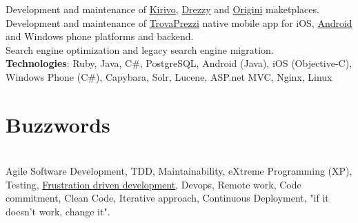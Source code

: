 \documentclass[letterpaper]{twentysecondcv} %
\begin{document}
\begin{twenty}
{	Development and maintenance  of \href{http://www.kirivo.it}{Kirivo}, \href{http://www.drezzy.it}{Drezzy} and \href{http://www.origini.it}{Origini} maketplaces.\\	
	Development and maintenance  of \href{http://www.trovaprezzi.it}{TrovaPrezzi} native mobile app for iOS, \href{https://play.google.com/store/apps/details?id=it.trovaprezzi.android}{Android}
	and Windows phone platforms and backend.\\
	Search engine optimization and legacy search engine migration.\\
\textbf{Technologies}: Ruby, Java, C\#, PostgreSQL, Android (Java), iOS (Objective-C), Windows Phone (C\#), Capybara, Solr, Lucene, ASP.net MVC, Nginx, Linux
}
\end{twenty}



\section{Buzzwords}\\
Agile Software Development, TDD, Maintainability, eXtreme Programming (XP), Testing, \href{https://www.marcopolita.me/blog/2021/02/06/frustration-driven-developer.html}{Frustration driven development}, Devops, 
Remote work, Code commitment, Clean Code, Iterative approach, Continuous Deployment, "if it doesn't work, change it".







\end{document}
